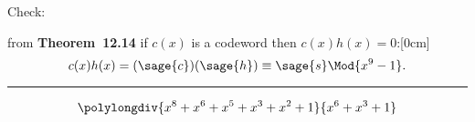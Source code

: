 \begin{enumerate}[label=(\roman*)]
Check:

from \textbf{Theorem~12.14} if $c(x)$ is a codeword then $c(x)h(x)=0$:[0cm]
\[
	c(x)h(x) = (\sage{c})(\sage{h}) \equiv \sage{s}\Mod{x^9 -1}.
\]
\end{enumerate}
\rule{\textwidth}{2px}
\[
	\polylongdiv{x^8+x^6+x^5+x^3+x^2+1}{x^6+x^3+1}
\]





